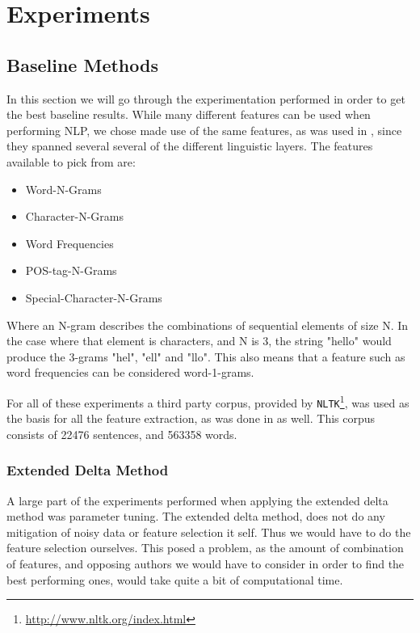 \section{Experiments} \label{sec:experiments}


\subsection{Baseline Methods}

In this section we will go through the experimentation performed in order to
get the best baseline results. While many different features can be used when
performing \gls{NLP}, we chose made use of the same features, as was used in
\cite{US}, since they spanned several several of the different linguistic
layers. The features available to pick from are:

\begin{itemize}
    \item Word-N-Grams 
    \item Character-N-Grams
    \item Word Frequencies
    \item \gls{POS}-tag-N-Grams
    \item Special-Character-N-Grams
\end{itemize}

Where an N-gram describes the combinations of sequential elements of size N. In
the case where that element is characters, and N is 3, the string "hello" would
produce the 3-grams "hel", "ell" and "llo". This also means that a feature such
as word frequencies can be considered word-1-grams. 

For all of these experiments a third party corpus, provided by
\texttt{NLTK}\footnote{\url{http://www.nltk.org/index.html}}, was used as
the basis for all the feature extraction, as was done in \cite{US} as well. 
This corpus consists of 22476 sentences, and 563358 words.

\subsubsection{Extended Delta Method}

A large part of the experiments performed when applying the extended delta
method was parameter tuning. 
The extended delta method, does not do any mitigation of noisy data or feature
selection it self. Thus we would have to do the feature selection ourselves.
This posed a problem, as the amount of combination of features, and opposing
authors we would have to consider in order to find the best performing ones,
would take quite a bit of computational time.

